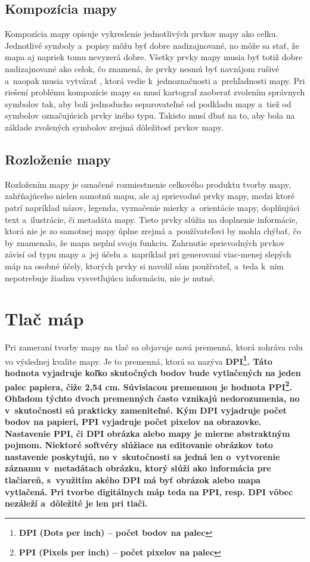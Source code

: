 \subsection*{Kompozícia mapy}
Kompozícia mapy opisuje vykreslenie jednotlivých prvkov mapy ako celku. Jednotlivé symboly a~popisy môžu byť dobre nadizajnované, no môže sa stať, že mapa aj napriek tomu nevyzerá dobre. Všetky prvky mapy musia byť totiž dobre nadizajnované ako celok, čo znamená, že prvky nesmú byť navzájom rušivé a~naopak musia vytvárať , ktorá vedie k~jednoznačnosti a~prehľadnosti mapy. Pri riešení problému kompozície mapy sa musí kartograf zaoberať zvolením správnych symbolov tak, aby boli jednoducho separovateľné od podkladu mapy a~tiež od symbolov označujúcich prvky iného typu. Takisto musí dbať na to, aby bola na základe zvolených symbolov zrejmá dôležitosť prvkov mapy.

\subsection*{Rozloženie mapy}
Rozložením mapy je označené rozmiestnenie celkového produktu tvorby mapy, zahŕňajúceho nielen samotnú mapu, ale aj sprievodné prvky mapy, medzi ktoré patrí napríklad názov, legenda, vyznačenie mierky a~orientácie mapy, doplňujúci text a~ilustrácie, či metadáta mapy. Tieto prvky slúžia na doplnenie informácie, ktorá nie je zo samotnej mapy úplne zrejmá a~používateľovi by mohla chýbať, čo by znamenalo, že mapa neplní svoju funkciu. Zahrnutie sprievodných prvkov závisí od typu mapy a~jej účelu a~napríklad pri generovaní viac-menej slepých máp na osobné účely, ktorých prvky si navolil sám používateľ, a~teda k~nim nepotrebuje žiadnu vysvetľujúcu informáciu, nie je nutné.


\section{Tlač máp}
\label{print}
 Pri zameraní tvorby mapy na tlač sa objavuje nová premenná, ktorá zohráva rolu vo výslednej kvalite mapy. Je to premenná, ktorá sa nazýva \bf DPI\rm\footnote{\bf DPI \rm (Dots per inch) -- počet bodov na palec}. Táto hodnota vyjadruje koľko skutočných bodov bude vytlačených na jeden palec papiera, čiže 2,54 cm. Súvisiacou premennou je hodnota \bf PPI\rm\footnote{\bf PPI \rm (Pixels per inch) -- počet pixelov na palec}. Ohľadom týchto dvoch premenných často vznikajú nedorozumenia, no v~skutočnosti sú prakticky zameniteľné. Kým DPI vyjadruje počet bodov na papieri, PPI vyjadruje počet pixelov na obrazovke. Nastavenie PPI, či DPI obrázka alebo mapy je mierne abstraktným pojmom. Niektoré softvéry slúžiace na editovanie obrázkov toto nastavenie poskytujú, no v~skutočnosti sa jedná len o~vytvorenie záznamu v~metadátach obrázku, ktorý slúži ako informácia pre tlačiareň, s~využitím akého DPI má byť obrázok alebo mapa vytlačená. Pri tvorbe digitálnych máp teda na PPI, resp. DPI vôbec nezáleží a~dôležité je len pri tlači. 

